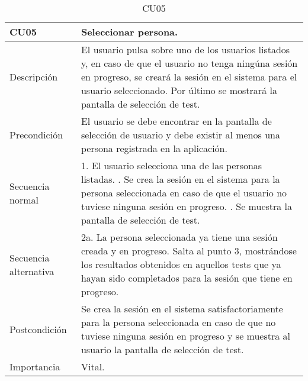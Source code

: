 \begin{table}[H]
\label{CU05}
\begin{center}
\begin{tabular}{| l | p{10cm} |}
\hline
CU05 & Seleccionar persona.\\
\hline
Descripción & El usuario pulsa sobre uno de los usuarios listados y, en caso de que el usuario no tenga ningúna sesión en progreso, se creará la sesión en el sistema para el usuario seleccionado. Por último se mostrará la pantalla de selección de test.\\
\hline
Precondición & El usuario se debe encontrar en la pantalla de selección de usuario y debe existir al menos una persona registrada en la aplicación.\\
\hline
Secuencia normal & 1. El usuario selecciona una de las personas listadas.
\newline 2. Se crea la sesión en el sistema para la persona seleccionada en caso de que el usuario no tuviese ninguna sesión en progreso.
\newline 3. Se muestra la pantalla de selección de test.\\
\hline
Secuencia alternativa & 2a. La persona seleccionada ya tiene una sesión creada y en progreso. Salta al punto 3, mostrándose los resultados obtenidos en aquellos tests que ya hayan sido completados para la sesión que tiene en progreso.\\
\hline
Postcondición & Se crea la sesión en el sistema satisfactoriamente para la persona seleccionada en caso de que no tuviese ninguna sesión en progreso y se muestra al usuario la pantalla de selección de test.\\
\hline
Importancia & Vital.\\
\hline
\end{tabular}
\end{center}
\caption{CU05}
\end{table}

